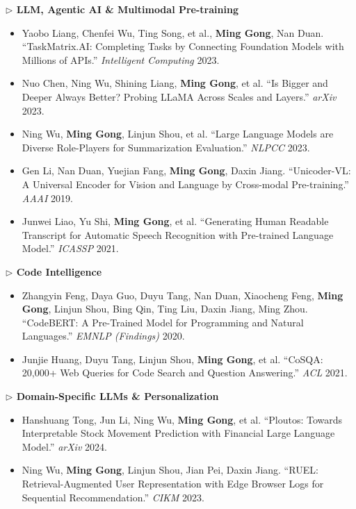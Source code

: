 \documentclass[10.5pt,letterpaper]{article}
\begin{document}
\noindent\textcolor{blue!60!black}{\textbf{$\triangleright$ LLM, Agentic AI \& Multimodal Pre-training}}
\begin{itemize}
  \item Yaobo Liang, Chenfei Wu, Ting Song, et al., \textbf{Ming Gong}, Nan Duan. ``TaskMatrix.AI: Completing Tasks by Connecting Foundation Models with Millions of APIs.'' \textit{Intelligent Computing} 2023.
  \item Nuo Chen, Ning Wu, Shining Liang, \textbf{Ming Gong}, et al. ``Is Bigger and Deeper Always Better? Probing LLaMA Across Scales and Layers.'' \textit{arXiv} 2023.
  \item Ning Wu, \textbf{Ming Gong}, Linjun Shou, et al. ``Large Language Models are Diverse Role-Players for Summarization Evaluation.'' \textit{NLPCC} 2023.
  \item Gen Li, Nan Duan, Yuejian Fang, \textbf{Ming Gong}, Daxin Jiang. ``Unicoder-VL: A Universal Encoder for Vision and Language by Cross-modal Pre-training.'' \textit{AAAI} 2019.
  \item Junwei Liao, Yu Shi, \textbf{Ming Gong}, et al. ``Generating Human Readable Transcript for Automatic Speech Recognition with Pre-trained Language Model.'' \textit{ICASSP} 2021.
\end{itemize}

\noindent\textcolor{blue!60!black}{\textbf{$\triangleright$ Code Intelligence}}
\begin{itemize}
  \item Zhangyin Feng, Daya Guo, Duyu Tang, Nan Duan, Xiaocheng Feng, \textbf{Ming Gong}, Linjun Shou, Bing Qin, Ting Liu, Daxin Jiang, Ming Zhou. ``CodeBERT: A Pre-Trained Model for Programming and Natural Languages.'' \textit{EMNLP (Findings)} 2020.
  \item Junjie Huang, Duyu Tang, Linjun Shou, \textbf{Ming Gong}, et al. ``CoSQA: 20,000+ Web Queries for Code Search and Question Answering.'' \textit{ACL} 2021.
\end{itemize}

\noindent\textcolor{blue!60!black}{\textbf{$\triangleright$ Domain-Specific LLMs \& Personalization}}
\begin{itemize}
  \item Hanshuang Tong, Jun Li, Ning Wu, \textbf{Ming Gong}, et al. ``Ploutos: Towards Interpretable Stock Movement Prediction with Financial Large Language Model.'' \textit{arXiv} 2024.
  \item Ning Wu, \textbf{Ming Gong}, Linjun Shou, Jian Pei, Daxin Jiang. ``RUEL: Retrieval-Augmented User Representation with Edge Browser Logs for Sequential Recommendation.'' \textit{CIKM} 2023.
\end{itemize}
\end{document}
